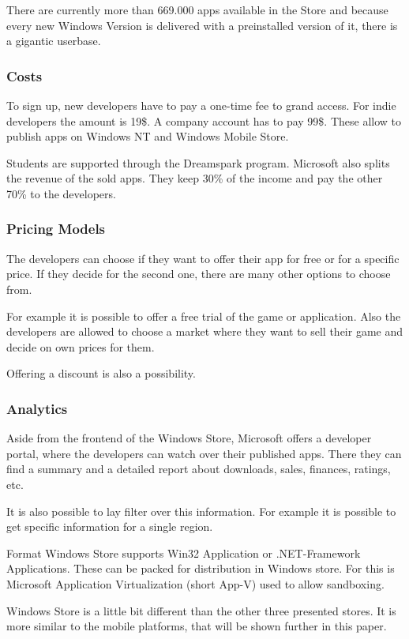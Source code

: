 There are currently more than 669.000 apps available in the Store and because every new Windows Version is delivered with a preinstalled version of it, there is a gigantic userbase.

\subsubsection{Costs}
\label{windows_costs}
To sign up, new developers have to pay a one-time fee to grand access. For indie developers the amount is 19\$. A company account has to pay 99\$. These allow to publish apps on Windows NT and Windows Mobile Store.

Students are supported through the Dreamspark program.
Microsoft also splits the revenue of the sold apps. They keep 30\% of the income and pay the other 70\% to the developers.

\subsubsection{Pricing Models}
\label{windows_pricing_model}
The developers can choose if they want to offer their app for free or for a specific price. If they decide for the second one, there are many other options to choose from.

For example it is possible to offer a free trial of the game or application. Also the developers are allowed to choose a market where they want to sell their game and decide on own prices for them.

Offering a discount is also a possibility.

\subsubsection{Analytics}
\label{windows_analytics}
Aside from the frontend of the Windows Store, Microsoft offers a developer portal, where the developers can watch over their published apps. There they can find a summary and a detailed report about downloads, sales, finances, ratings, etc.

It is also possible to lay filter over this information. For example it is possible to get specific information for a single region.

Format
Windows Store supports Win32 Application or .NET-Framework Applications. These can be packed for distribution in Windows store. For this is Microsoft Application Virtualization (short App-V) used to allow sandboxing.

Windows Store is a little bit different than the other three presented stores. It is more similar to the mobile platforms, that will be shown further in this paper.

